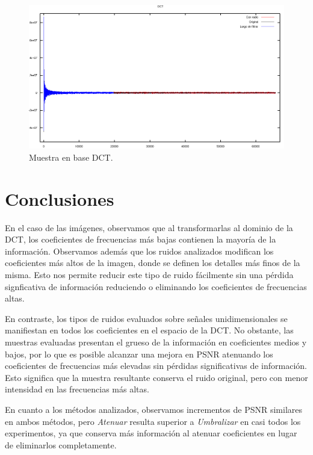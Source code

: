\documentclass[a4paper,10pt,twoside]{article}
\begin{document}
\begin{figure}[H]
  \centering
  \includegraphics[width=15cm]{graficos/lena_impulsivo_umbralizar_dct.png} 
  \caption{Muestra en base DCT.}
\end{figure}




\section{Conclusiones}

En el caso de las imágenes, observamos que al transformarlas al dominio de la DCT, los coeficientes de frecuencias más bajas contienen la mayoría de la información. Observamos además que los ruidos analizados modifican los coeficientes más altos de la imagen, donde se definen los detalles más finos de la misma. Esto nos permite reducir este tipo de ruido fácilmente sin una pérdida signficativa de información reduciendo o eliminando los coeficientes de frecuencias altas.

En contraste, los tipos de ruidos evaluados sobre señales unidimensionales se manifiestan en todos los coeficientes en el espacio de la DCT. No obstante, las muestras evaluadas presentan el grueso de la información en coeficientes medios y bajos, por lo que es posible alcanzar una mejora en PSNR atenuando los coeficientes de frecuencias más elevadas sin pérdidas significativas de información. Esto significa que la muestra resultante conserva el ruido original, pero con menor intensidad en las frecuencias más altas.

En cuanto a los métodos analizados, observamos incrementos de PSNR similares en ambos métodos, pero \textit{Atenuar} resulta superior a \textit{Umbralizar} en casi todos los experimentos, ya que conserva más información al atenuar coeficientes en lugar de eliminarlos completamente. 
\end{document}
